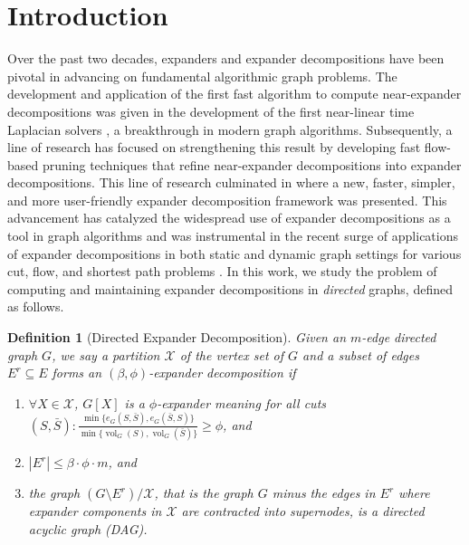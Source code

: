 \documentclass[11pt]{article}
\newtheorem{definition}[theorem]{Definition}
\DeclareMathOperator{\vol}{vol}
\begin{document}
\section{Introduction}
Over the past two decades, expanders and expander decompositions have been pivotal in advancing on fundamental algorithmic graph problems. The development and application of the first fast algorithm to compute near-expander decompositions was given in the development of the first near-linear time Laplacian solvers \cite{spielman2004nearly}, a breakthrough in modern graph algorithms. Subsequently, a line of research \cite{henzinger2020local, wulff2017fully, nanongkai2017dynamic,nanongkai2017dynamicMinimum} has focused on strengthening this result by developing fast flow-based pruning techniques that refine near-expander decompositions into expander decompositions. This line of research culminated in \cite{saranurak2019expander} where a new, faster, simpler, and more user-friendly expander decomposition framework was presented. This advancement has catalyzed the widespread use of expander decompositions as a tool in graph algorithms and was instrumental in the recent surge of applications of expander decompositions in both static and dynamic graph settings for various cut, flow, and shortest path problems \cite{spielman2004nearly, kelner2014almost, henzinger2020local, wulff2017fully, nanongkai2017dynamic,nanongkai2017dynamicMinimum,chuzhoy2019new,bernstein2020deterministic,liu2020vertex, bernstein2020fully,van2021minimum,saranurak2021simple,chalermsook2021vertex, li2021deterministic,chuzhoy2021deterministic, goranci2021expander, chuzhoy2021decremental,bernstein2022deterministic, bernstein2022deterministic, kyng2022derandomizing, jin2022fully, van2023deterministic, kyng2023dynamic, chen2023almost, jin2024fully, chuzhoy2024maximum, bernstein2024maximum, vdB2024decrMincost}. In this work, we study the problem of computing and maintaining expander decompositions in \emph{directed} graphs, defined as follows. 

\begin{definition}[Directed Expander Decomposition]\label{def:expdecomIntro}
Given an $m$-edge directed graph $G$, we say a partition $\mathcal{X}$ of the vertex set of $G$ and a subset of edges $E^r \subseteq E$ forms an $(\beta, \phi)$-expander decomposition if 
\begin{enumerate}
    \item \label{Def:ED-item1} $\forall X \in \mathcal{X}$, $G[X]$ is a $\phi$-expander meaning for all cuts $(S, \bar{S}): \frac{\min\{e_G(S, \bar{S}), e_G(\bar{S}, S)\}}{\min\{\vol_G(S), \vol_G(\bar{S})\}} \geq \phi$, and
    \item \label{Def:ED-item2} $|E^r| \leq \beta \cdot \phi \cdot m$, and 
    \item \label{Def:ED-item3} the graph $(G \setminus E^r) / \mathcal{X}$, that is the graph $G$ minus the edges in $E^r$ where expander components in $\mathcal{X}$ are contracted into supernodes, is a directed acyclic graph (DAG).
\end{enumerate}
\end{definition}
\end{document}

